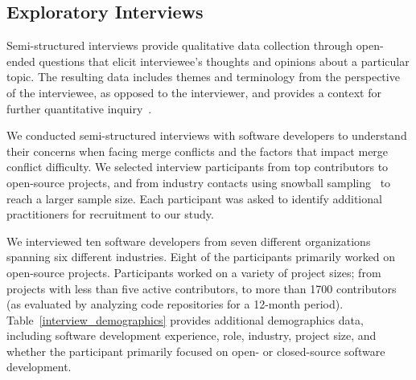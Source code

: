 \subsection{Exploratory Interviews}\label{interviews}

Semi-structured interviews provide qualitative data collection through open-ended questions that elicit interviewee's thoughts and opinions about a particular topic.
The resulting data includes themes and terminology from the perspective of the interviewee, as opposed to the interviewer, and provides a context for further quantitative inquiry~\cite{easterbrook2008selecting}.

We conducted semi-structured interviews with software developers to understand their concerns when facing merge conflicts and the factors that impact merge conflict difficulty.
We selected interview participants from top contributors to open-source projects, and from industry contacts using snowball sampling~\cite{goodman1961snowball} to reach a larger sample size.
Each participant was asked to identify additional practitioners for recruitment to our study.

We interviewed ten software developers from seven different organizations spanning six different industries.
Eight of the participants primarily worked on open-source projects.
Participants worked on a variety of project sizes; from projects with less than five active contributors, to more than 1700 contributors (as evaluated by analyzing code repositories for a 12-month period).
Table~\ref{interview_demographics} provides additional demographics data, including software development experience, role, industry, project size, and whether the participant primarily focused on open- or closed-source software development.

